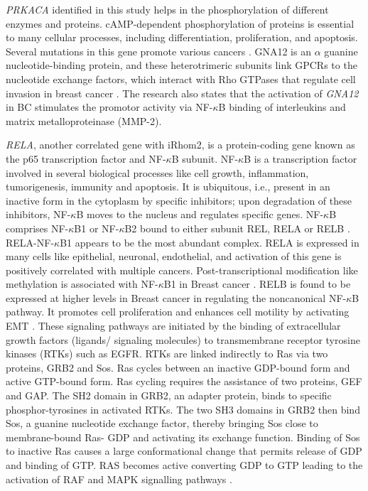 \documentclass[fleqn,10pt,lineno]{wlpeerj}
\begin{document}
\textit{PRKACA} identified in this study helps in the phosphorylation of different enzymes and proteins. cAMP-dependent phosphorylation of proteins is essential to many cellular processes, including differentiation, proliferation, and apoptosis. Several mutations in this gene promote various cancers \citep{Moody2014}. GNA12 is an $\alpha$ guanine nucleotide-binding protein, and these heterotrimeric subunits link GPCRs to the nucleotide exchange factors, which interact with Rho GTPases that regulate cell invasion in breast cancer \citep{Chia2014}. The research also states that the activation of  \textit{GNA12} in BC stimulates the promotor activity via NF-$\kappa$B binding of interleukins and matrix metalloproteinase (MMP-2). 
 
 \textit{RELA}, another correlated gene with iRhom2, is a protein-coding gene known as the p65 transcription factor and NF-$\kappa$B subunit. NF-$\kappa$B is a transcription factor involved in several biological processes like cell growth, inflammation, tumorigenesis, immunity and apoptosis. It is ubiquitous, i.e., present in an inactive form in the cytoplasm by specific inhibitors; upon degradation of these inhibitors, NF-$\kappa$B moves to the nucleus and regulates specific genes. NF-$\kappa$B comprises NF-$\kappa$B1 or NF-$\kappa$B2 bound to either subunit REL, RELA or RELB \cite{Chaturvedi2011}. RELA-NF-$\kappa$B1 appears to be the most abundant complex. RELA is expressed in many cells like epithelial, neuronal, endothelial, and activation of this gene is positively correlated with multiple cancers. Post-transcriptional modification like methylation is associated with NF-$\kappa$B1 in Breast cancer \citep{Jeong2019}. RELB is found to be expressed at higher levels in Breast cancer in regulating the noncanonical NF-$\kappa$B pathway. It promotes cell proliferation and enhances cell motility by activating EMT \citep{Wang2020}. These signaling pathways are initiated by the binding of extracellular growth factors (ligands/ signaling molecules) to transmembrane receptor tyrosine kinases (RTKs) such as EGFR. RTKs are linked indirectly to Ras via two proteins, GRB2 and Sos. Ras cycles between an inactive GDP-bound form and active GTP-bound form. Ras cycling requires the assistance of two proteins, GEF and GAP. The SH2 domain in GRB2, an adapter protein, binds to specific phosphor-tyrosines in activated RTKs. The two SH3 domains in GRB2 then bind Sos, a guanine nucleotide exchange factor, thereby bringing Sos close to membrane-bound Ras- GDP and  activating its exchange function. Binding of Sos to inactive Ras causes a large conformational change that permits release of GDP and binding of GTP. RAS becomes active converting GDP to GTP leading to the activation of RAF and MAPK signalling pathways \citep{Cussac1994}. 
 
\end{document}

